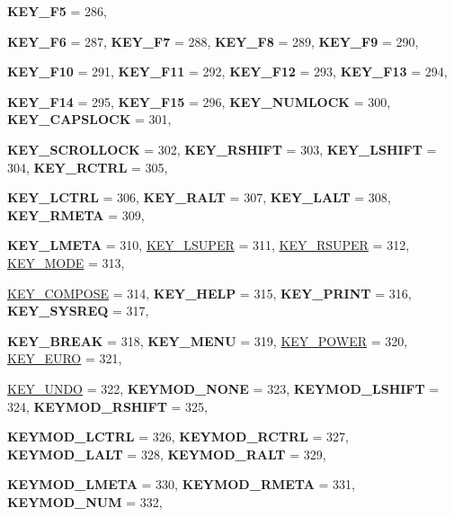 \begin{DoxyCompactItemize}
{\bfseries KEY\_\-F5} =  286, 
\par
{\bfseries KEY\_\-F6} =  287, 
{\bfseries KEY\_\-F7} =  288, 
{\bfseries KEY\_\-F8} =  289, 
{\bfseries KEY\_\-F9} =  290, 
\par
{\bfseries KEY\_\-F10} =  291, 
{\bfseries KEY\_\-F11} =  292, 
{\bfseries KEY\_\-F12} =  293, 
{\bfseries KEY\_\-F13} =  294, 
\par
{\bfseries KEY\_\-F14} =  295, 
{\bfseries KEY\_\-F15} =  296, 
{\bfseries KEY\_\-NUMLOCK} =  300, 
{\bfseries KEY\_\-CAPSLOCK} =  301, 
\par
{\bfseries KEY\_\-SCROLLOCK} =  302, 
{\bfseries KEY\_\-RSHIFT} =  303, 
{\bfseries KEY\_\-LSHIFT} =  304, 
{\bfseries KEY\_\-RCTRL} =  305, 
\par
{\bfseries KEY\_\-LCTRL} =  306, 
{\bfseries KEY\_\-RALT} =  307, 
{\bfseries KEY\_\-LALT} =  308, 
{\bfseries KEY\_\-RMETA} =  309, 
\par
{\bfseries KEY\_\-LMETA} =  310, 
\hyperlink{classphys_1_1MetaCode_a3e501cbb5bf0f6f1fdb7211465bda8d8aab77afaba4fc97faa9b9fe40d3a9ebbb}{KEY\_\-LSUPER} =  311, 
\hyperlink{classphys_1_1MetaCode_a3e501cbb5bf0f6f1fdb7211465bda8d8a84e2235ece031f83821867486ff52149}{KEY\_\-RSUPER} =  312, 
\hyperlink{classphys_1_1MetaCode_a3e501cbb5bf0f6f1fdb7211465bda8d8a9e26ea2006e876ccaa80fe4ae441da46}{KEY\_\-MODE} =  313, 
\par
\hyperlink{classphys_1_1MetaCode_a3e501cbb5bf0f6f1fdb7211465bda8d8aae92d5418d0273c8b43cb11f5e251a20}{KEY\_\-COMPOSE} =  314, 
{\bfseries KEY\_\-HELP} =  315, 
{\bfseries KEY\_\-PRINT} =  316, 
{\bfseries KEY\_\-SYSREQ} =  317, 
\par
{\bfseries KEY\_\-BREAK} =  318, 
{\bfseries KEY\_\-MENU} =  319, 
\hyperlink{classphys_1_1MetaCode_a3e501cbb5bf0f6f1fdb7211465bda8d8a08a2d04e3a40d746b81913e92a25a038}{KEY\_\-POWER} =  320, 
\hyperlink{classphys_1_1MetaCode_a3e501cbb5bf0f6f1fdb7211465bda8d8aee70075958d1650a7b48ba507103ec0c}{KEY\_\-EURO} =  321, 
\par
\hyperlink{classphys_1_1MetaCode_a3e501cbb5bf0f6f1fdb7211465bda8d8a15aabd8c4e36284ec057fafbda0d120a}{KEY\_\-UNDO} =  322, 
{\bfseries KEYMOD\_\-NONE} =  323, 
{\bfseries KEYMOD\_\-LSHIFT} =  324, 
{\bfseries KEYMOD\_\-RSHIFT} =  325, 
\par
{\bfseries KEYMOD\_\-LCTRL} =  326, 
{\bfseries KEYMOD\_\-RCTRL} =  327, 
{\bfseries KEYMOD\_\-LALT} =  328, 
{\bfseries KEYMOD\_\-RALT} =  329, 
\par
{\bfseries KEYMOD\_\-LMETA} =  330, 
{\bfseries KEYMOD\_\-RMETA} =  331, 
{\bfseries KEYMOD\_\-NUM} =  332, 

\end{DoxyCompactItemize}
